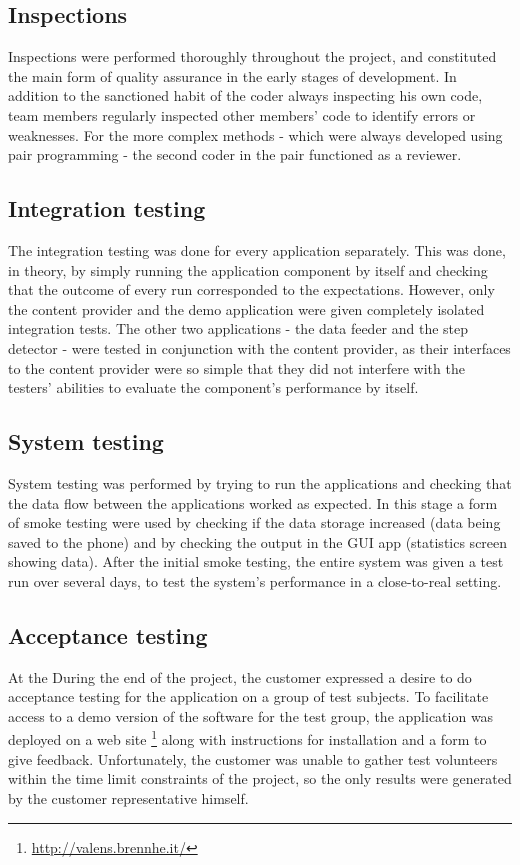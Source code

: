 \subsection{Inspections}
Inspections were performed thoroughly throughout the project, and constituted the main form of quality assurance in the early stages of development. In addition to the sanctioned habit of the coder always inspecting his own code, team members regularly inspected other members' code to identify errors or weaknesses. For the more complex methods - which were always developed using pair programming - the second coder in the pair functioned as a reviewer.
\subsection{Integration testing}
The integration testing was done for every application separately. This was done, in theory, by simply running the application component by itself and checking that the outcome of every run corresponded to the expectations. However, only the content provider and the demo application were given completely isolated integration tests. The other two applications - the data feeder and the step detector - were tested in conjunction with the content provider, as their interfaces to the content provider were so simple that they did not interfere with the testers' abilities to evaluate the component's performance by itself.
\subsection{System testing}
System testing was performed by trying to run the applications and checking that the data flow between the applications worked as expected. In this stage a form of smoke testing were used by checking if the data storage increased (data being saved to the phone) and by checking the output in the GUI app (statistics screen showing data). After the initial smoke testing, the entire system was given a test run over several days, to test the system's performance in a close-to-real setting. 

\subsection{Acceptance testing}
\label{def:accTesting}
At the During the end of the project, the customer expressed a desire to do acceptance testing for the application on a group of test subjects. To facilitate access to a demo version of the software for the test group, the application was deployed on a web site \footnote{\url{http://valens.brennhe.it/}} along with instructions for installation and a form to give feedback. Unfortunately, the customer was unable to gather test volunteers within the time limit constraints of the project, so the only results were generated by the customer representative himself. 

